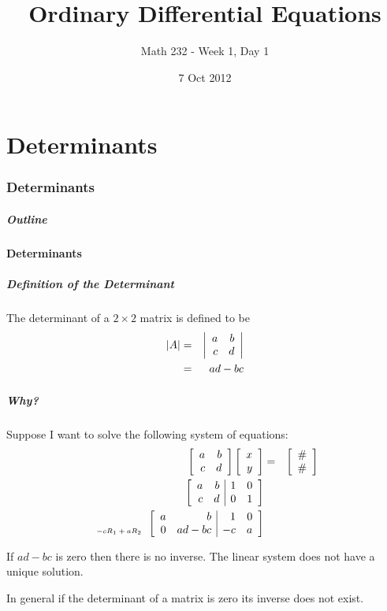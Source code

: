 \part{Determinants}
\section{Determinants}

\title{Ordinary Differential Equations}
\subtitle{Math 232 - Week 1, Day 1}
\date{7 Oct 2012}

\begin{frame}
  \titlepage
\end{frame}

\begin{frame}
  \frametitle{Outline}
\end{frame}


\subsection{Determinants}


\begin{frame}
  \frametitle{Definition of the Determinant}

  The determinant of a $2\times 2$ matrix is defined to be
  \begin{eqnarray*}
    |A| & = & \left| \begin{array}{rr} a & b \\ c & d \end{array} \right| \\
    & = & ad - bc
  \end{eqnarray*}

\end{frame}


\begin{frame}
  \frametitle{Why?}

  Suppose I want to solve the following system of equations:
  \begin{eqnarray*}
    \arrayTwo{a}{b}{c}{d} \vecTwo{x}{y} & = & \vecTwo{\#}{\#} \\
    \startRowOpsTwo
    \oneRowOpsTwo{a}{b}{1}{0}
    \oneRowOpsTwo{c}{d}{0}{1}
    \stopRowOps \\
    \stateTwo{}{-cR_1+aR_2}
    \startRowOpsTwo
    \oneRowOpsTwo{a}{b}{1}{0}
    \oneRowOpsTwo{0}{ad-bc}{-c}{a}
    \stopRowOps
  \end{eqnarray*}

  {
    If $ad-bc$ is zero then there is no inverse. The linear system
    does not have a unique solution.
  }

  {
    In general if the determinant of a matrix is zero its inverse does
    not exist. 
  }

\end{frame}


